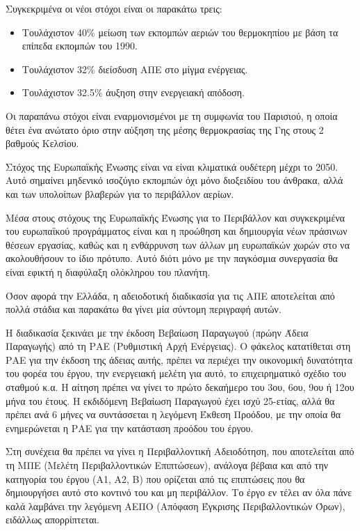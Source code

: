 \documentclass[12pt]{report}
\begin{document}
Συγκεκριμένα οι νέοι στόχοι είναι οι παρακάτω τρεις:
\begin{itemize}
\item Τουλάχιστον 40\% μείωση των εκπομπών αεριών του θερμοκηπίου με βάση τα επίπεδα εκπομπών του 1990.
\item Τουλάχιστον 32\% διείσδυση ΑΠΕ στο μίγμα ενέργειας.
\item Τουλάχιστον 32.5\% άυξηση στην ενεργειακή απόδοση.
\end{itemize}

Οι παραπάνω στόχοι είναι εναρμονισμένοι με τη συμφωνία του Παρισιού, η οποία θέτει ένα ανώτατο όριο στην αύξηση της μέσης θερμοκρασίας της Γης στους 2 βαθμούς Κελσίου.

Στόχος της Ευρωπαϊκής Ένωσης είναι να είναι κλιματικά ουδέτερη μέχρι το 2050. Αυτό σημαίνει μηδενικό ισοζύγιο εκπομπών όχι μόνο διοξειδίου του άνθρακα, αλλά και των υπολοίπων βλαβερών για το περιβάλλον αερίων.

Μέσα στους στόχους της Ευρωπαϊκής Ένωσης για το Περιβάλλον και συγκεκριμένα του ευρωπαϊκού προγράμματος {} είναι και η προώθηση και δημιουργία νέων πράσινων θέσεων εργασίας, καθώς και η 
ενθάρρυνση των άλλων μη ευρωπαϊκών χωρών στο να ακολουθήσουν το ίδιο πρότυπο. Αυτό διότι μόνο με την παγκόσμια συνεργασία θα είναι εφικτή η διαφύλαξη ολόκληρου του πλανήτη.

\begin{center}
\end{center}

Όσον αφορά την Ελλάδα, η αδειοδοτική διαδικασία για τις ΑΠΕ αποτελείται από πολλά στάδια και παρακάτω θα γίνει μία σύντομη περιγραφή αυτών.

Η διαδικασία ξεκινάει με την έκδοση Βεβαίωση Παραγωγού (πρώην Άδεια Παραγωγής) από τη ΡΑΕ (Ρυθμιστική Αρχή Ενέργειας). Ο φάκελος κατατίθεται στη ΡΑΕ για την έκδοση της άδειας αυτής, πρέπει να περιέχει την οικονομική δυνατότητα του 
φορέα του έργου, την ενεργειακή μελέτη για αυτό, το επιχειρηματικό σχέδιο του σταθμού κ.α. Η αίτηση πρέπει να γίνει το πρώτο δεκαήμερο του 3ου, 6ου, 9ου ή 12ου μήνα του έτους. Η εκδιδόμενη Βεβαίωση Παραγωγού έχει ισχύ 25-ετίας, 
αλλά θα πρέπει ανά 6 μήνες να συντάσσεται η λεγόμενη Έκθεση Προόδου, με την οποία θα ενημερώνεται η ΡΑΕ για την κατάσταση προόδου του έργου.

Στη συνέχεια θα πρέπει να γίνει η Περιβαλλοντική Αδειοδότηση, που αποτελείται από τη ΜΠΕ (Μελέτη Περιβαλλοντικών Επιπτώσεων), ανάλογα βέβαια και από την κατηγορία του έργου (Α1, Α2, Β) που ορίζεται
από τις επιπτώσεις που θα δημιουργήσει αυτό στο κοντινό του και μη περιβάλλον. Το έργο εν τέλει αν όλα πάνε καλά λαμβάνει την λεγόμενη ΑΕΠΟ (Απόφαση Έγκρισης Περιβαλλοντικών Όρων), ειδάλλως απορρίπτεται.
\end{document}
